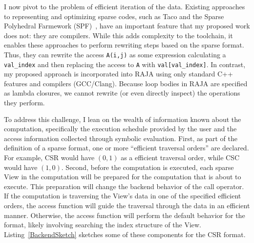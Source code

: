 \documentclass{article}
\begin{document}
I now pivot to the problem of efficient iteration of the data.
Existing approaches to representing and optimizing sparse codes, such as Taco and the Sparse Polyhedral Farmework (SPF)~\cite{strout2016approach}, have an important feature that my proposed work does not: they are compilers.
While this adds complexity to the toolchain, it enables these approaches to perform rewriting steps based on the sparse format.
Thus, they can rewrite the access \verb.A(i,j). as some expression calculating a \verb.val_index. and then replacing the access to \verb.A. with \verb.val[val_index]..
In contrast, my proposed approach is incorporated into RAJA using only standard C++ features and compilers (GCC/Clang).
Because loop bodies in RAJA are specified as lambda closures, we cannot rewrite (or even directly inspect) the operations they perform.

To address this challenge, I lean on the wealth of information known about the computation, specifically the execution schedule provided by the user and the access information collected through symbolic evaluation. 
First, as part of the definition of a sparse format, one or more \enquote{efficient traversal orders} are declared. 
For example, CSR would have $(0,1)$ as a efficient traversal order, while CSC would have $(1,0)$.
Second, before the computation is executed, each sparse View in the computation will be prepared for the computation that is about to execute.
This preparation will change the backend behavior of the call operator.
If the computation is traversing the View's data in one of the specified efficient orders, the access function will guide the traversal through the data in an efficient manner.
Otherwise, the access function will perform the default behavior for the format, likely involving searching the index structure of the View.
Listing~\ref{BackendSketch} sketches some of these components for the CSR format. 
\end{document}
